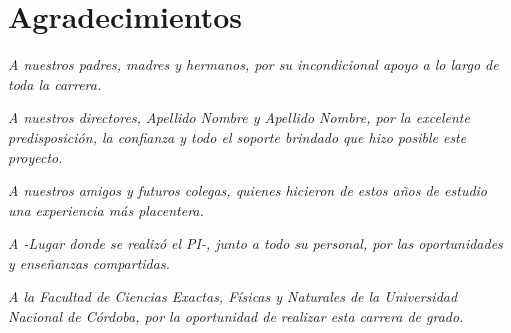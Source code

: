 \chapter*{Agradecimientos}

\textit{A nuestros padres, madres y hermanos, por su incondicional apoyo a lo largo de toda la carrera.}

\vspace{1cm}

\textit{A nuestros directores, Apellido Nombre y Apellido Nombre, por la excelente predisposición, la confianza y todo el soporte brindado que hizo posible este proyecto.}

\vspace{1cm}

\textit{A nuestros amigos y futuros colegas, quienes hicieron de estos años de estudio una experiencia más placentera.}

\vspace{1cm}

\textit{A -Lugar donde se realizó el PI-, junto a todo su personal, por las oportunidades y enseñanzas compartidas.}

\vspace{1cm}

\textit{A la Facultad de Ciencias Exactas, Físicas y Naturales de la Universidad Nacional de Córdoba, por la oportunidad de realizar esta carrera de grado.}


\clearpage{\thispagestyle{empty}\cleardoublepage}       %